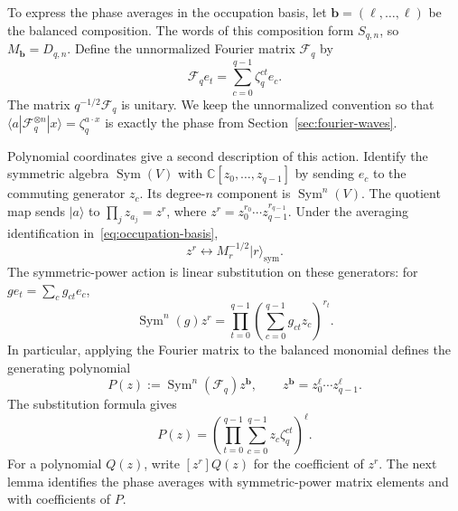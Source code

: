 \documentclass[11pt,a4paper]{article}
\numberwithin{equation}{section}
\numberwithin{figure}{section}
\numberwithin{table}{section}
\numberwithin{footnote}{section}
\theoremstyle{informal}\newtheorem*{informaltheorem}{Informal theorem}
\theoremstyle{definition}\newtheorem{example}{Example}[section]
\theoremstyle{remark}\newtheorem{remark}[theorem]{Remark}
\newcommand{\C}{\mathbb C}
\begin{document}
To express the phase averages in the occupation basis, let
\(\mathbf b=(\ell,\ldots,\ell)\) be the balanced composition.
The words of this composition form \(S_{q,n}\), so
\(M_{\mathbf b}=D_{q,n}\).
Define the unnormalized Fourier matrix \(\mathcal F_q\) by
\begin{equation}
 \mathcal F_q e_t=\sum_{c=0}^{q-1}\zeta_q^{ct}e_c.
\end{equation}
The matrix \(q^{-1/2}\mathcal F_q\) is unitary. We keep the
unnormalized convention so that
\(\langle a|\mathcal F_q^{\otimes n}|x\rangle=\zeta_q^{a\cdot x}\)
is exactly the phase from Section~\ref{sec:fourier-waves}.

Polynomial coordinates give a second description of this action.
Identify the symmetric algebra \(\operatorname{Sym}(V)\) with
\(\C[z_0,\ldots,z_{q-1}]\) by sending \(e_c\) to the commuting
generator \(z_c\). Its degree-\(n\) component is
\(\operatorname{Sym}^n(V)\). The quotient map sends
\(|a\rangle\) to \(\prod_j z_{a_j}=z^r\), where
\(z^r=z_0^{r_0}\cdots z_{q-1}^{r_{q-1}}\).
Under the averaging identification in~\eqref{eq:occupation-basis},
\begin{equation}\label{eq:monomial-occupation}
 z^r\longleftrightarrow M_r^{-1/2}|r\rangle_{\mathrm{sym}}.
\end{equation}
The symmetric-power action is linear substitution on these
generators: for \(g e_t=\sum_c g_{ct}e_c\),
\begin{equation}
 \operatorname{Sym}^n(g)z^r
 =\prod_{t=0}^{q-1}
       \left(\sum_{c=0}^{q-1}g_{ct}z_c\right)^{r_t}.
\end{equation}
In particular, applying the Fourier matrix to the balanced monomial
defines the generating polynomial
\begin{equation}\label{eq:phase-generating-polynomial}
 P(z):=\operatorname{Sym}^n(\mathcal F_q)z^{\mathbf b},
 \qquad z^{\mathbf b}=z_0^\ell\cdots z_{q-1}^\ell.
\end{equation}
The substitution formula gives
\begin{equation}\label{eq:balanced-phase-product}
 P(z)=\left(\prod_{t=0}^{q-1}
              \sum_{c=0}^{q-1}z_c\zeta_q^{ct}\right)^\ell.
\end{equation}
For a polynomial \(Q(z)\), write \([z^r]Q(z)\) for the
coefficient of \(z^r\). The next lemma identifies the phase averages
with symmetric-power matrix elements and with coefficients of \(P\).
\end{document}
